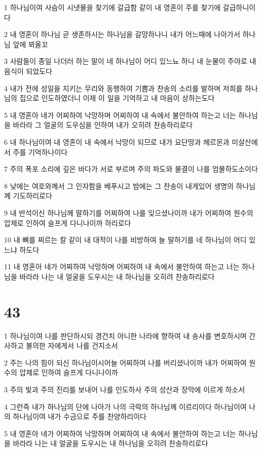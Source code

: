 \par 1 하나님이여 사슴이 시냇물을 찾기에 갈급함 같이 내 영혼이 주를 찾기에 갈급하니이다
\par 2 내 영혼이 하나님 곧 생존하시는 하나님을 갈망하나니 내가 어느때에 나아가서 하나님 앞에 뵈올꼬
\par 3 사람들이 종일 나더러 하는 말이 네 하나님이 어디 있느뇨 하니 내 눈물이 주야로 내 음식이 되었도다
\par 4 내가 전에 성일을 지키는 무리와 동행하여 기쁨과 찬송의 소리를 발하며 저희를 하나님의 집으로 인도하였더니 이제 이 일을 기억하고 내 마음이 상하는도다
\par 5 내 영혼아 네가 어찌하여 낙망하며 어찌하여 내 속에서 불안하여 하는고 너는 하나님을 바라라 그 얼굴의 도우심을 인하여 내가 오히려 찬송하리로다
\par 6 내 하나님이여 내 영혼이 내 속에서 낙망이 되므로 내가 요단땅과 헤르몬과 미살산에서 주를 기억하나이다
\par 7 주의 폭포 소리에 깊은 바다가 서로 부르며 주의 파도와 물결이 나를 엄몰하도소이다
\par 8 낮에는 여호와께서 그 인자함을 베푸시고 밤에는 그 찬송이 내게있어 생명의 하나님께 기도하리로다
\par 9 내 반석이신 하나님께 말하기를 어찌하여 나를 잊으셨나이까 내가 어찌하여 원수의 압제로 인하여 슬프게 다니나이까 하리로다
\par 10 내 뼈를 찌르는 칼 같이 내 대적이 나를 비방하여 늘 말하기를 네 하나님이 어디 있느냐 하도다
\par 11 내 영혼아 네가 어찌하여 낙망하며 어찌하여 내 속에서 불안하여 하는고 너는 하나님을 바라라 나는 내 얼굴을 도우시는 내 하나님을 오히려 찬송하리로다

\chapter{43}

\par 1 하나님이여 나를 판단하시되 경건치 아니한 나라에 향하여 내 송사를 변호하시며 간사하고 불의한 자에게서 나를 건지소서
\par 2 주는 나의 힘이 되신 하나님이시어늘 어찌하여 나를 버리셨나이까 내가 어찌하여 원수의 압제로 인하여 슬프게 다니나이까
\par 3 주의 빛과 주의 진리를 보내어 나를 인도하사 주의 성산과 장막에 이르게 하소서
\par 4 그런즉 내가 하나님의 단에 나아가 나의 극락의 하나님께 이르리이다 하나님이여 나의 하나님이여 내가 수금으로 주를 찬양하리이다
\par 5 내 영혼아 네가 어찌하여 낙망하며 어찌하여 내 속에서 불안하여 하는고 너는 하나님을 바라라 나는 내 얼굴을 도우시는 내 하나님을 오히려 찬송하리로다

